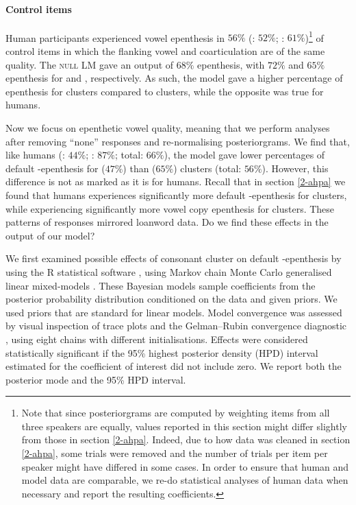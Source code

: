 {\paragraph{Control items}
Human participants experienced vowel epenthesis in $56\%$ (: $52\%$; : $61\%$)\footnote{Note that since posteriorgrams are computed by weighting items from all three speakers are equally, values reported in this section might differ slightly from those in section \ref{2-ahpa}. Indeed, due to how data was cleaned in section \ref{2-ahpa}, some trials were removed and the number of trials per item per speaker might have differed in some cases. In order to ensure that human and model data are comparable, we re-do statistical analyses of human data when necessary and report the resulting coefficients.} of control items in which the flanking vowel and coarticulation are of the same quality. The \textsc{null LM} gave an output of $68\%$ epenthesis, with $72\%$ and $65\%$ epenthesis for  and , respectively. As such, the model gave a higher percentage of epenthesis for  clusters compared to clusters, while the opposite was true for humans.

Now we focus on epenthetic vowel quality, meaning that we perform analyses after removing ``none'' responses and re-normalising posteriorgrams. We find that, like humans (: $44\%$; : $87\%$; total: $66\%$), the model gave lower percentages of default -epenthesis for  ($47\%$) than  ($65\%$) clusters (total: $56\%$). However, this difference is not as marked as it is for humans. Recall that in section \ref{2-ahpa} we found that humans experiences significantly more default -epenthesis for  clusters, while experiencing significantly more vowel copy epenthesis for  clusters. These patterns of responses mirrored loanword data. Do we find these effects in the output of our model? 

We first examined possible effects of consonant cluster on default -epenthesis by using the R statistical software \cite{R-base}, using Markov chain Monte Carlo generalised linear mixed-models \cite{R-MCMCglmm, R-coda}. These Bayesian models sample coefficients from the posterior probability distribution conditioned on the data and given priors. We used priors that are standard for linear models. Model convergence was assessed by visual inspection of trace plots and the Gelman–Rubin convergence diagnostic \cite{gelman1992}, using eight chains with different initialisations. Effects were considered statistically significant if the 95\% highest posterior density (HPD) interval estimated for the coefficient of interest did not include zero. We report both the posterior mode and the 95\% HPD interval.  

}
